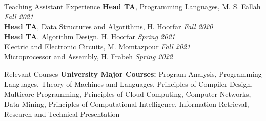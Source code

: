 \documentclass{resume} %
\begin{document}
\begin{rSection}{Teaching Assistant Experience}
	{{\bf Head TA}, Programming Languages, M. S. Fallah} \hfill {\em Fall 2021}\\
    {{\bf Head TA}, Data Structures and Algorithms, H. Hoorfar} \hfill {\em Fall 2020}\\
    {{\bf Head TA}, Algorithm Design, H. Hoorfar} \hfill {\em Spring 2021}\\
    {Electric and Electronic Circuits, M. Momtazpour} \hfill {\em Fall 2021}\\
    {Microprocessor and Assembly, H. Frabeh} \hfill {\em Spring 2022}\\
\end{rSection}






\begin{rSection}{Relevant Courses}
        {\bf University Major Courses:}
        Program Analysis, Programming Languages, Theory of Machines and Languages, Principles of Compiler Design, Multicore Programming, Principles of Cloud Computing, Computer Networks, Data Mining, Principles of Computational Intelligence, Information Retrieval, Research and Technical Presentation
\end{rSection}
\end{document}
